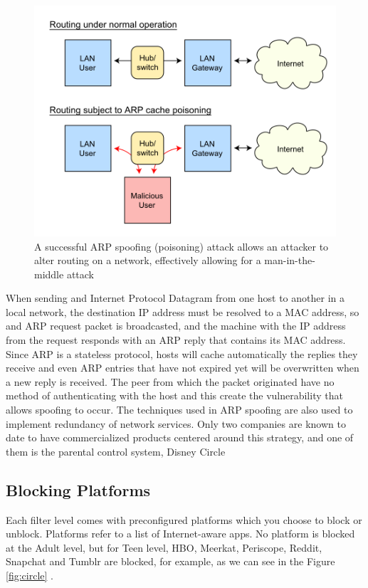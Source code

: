 \begin{figure}[th]
\centering
\includegraphics[width=1\textwidth]{Figures/arp-spoofing}
\decoRule
\caption{A successful ARP spoofing (poisoning) attack allows an attacker to alter routing on a network, effectively allowing for a man-in-the-middle attack}
\label{fig:arp-spoofing}
\end{figure}

When sending and Internet Protocol Datagram from one host to another in a local network, the destination IP address must be resolved to a MAC address, so and ARP request packet is broadcasted, and the machine with the IP address from the request responds with an ARP reply that contains its MAC address. Since ARP is a stateless protocol, hosts will cache automatically the replies they receive and even ARP entries that have not expired yet will be overwritten when a new reply is received. The peer from which the packet originated have no method of authenticating with the host and this create the vulnerability that allows spoofing to occur. The techniques used in ARP spoofing are also used to implement redundancy of network services. Only two companies are known to date to have commercialized products centered around this strategy, and one of them is the parental control system, Disney Circle

\subsection{Blocking Platforms}

Each filter level comes with preconfigured platforms which you choose to block or unblock. Platforms refer to a list of Internet-aware apps. No platform is blocked at the Adult level, but for Teen level, HBO, Meerkat, Periscope, Reddit, Snapchat and Tumblr are blocked, for example, as we can see in the Figure \ref{fig:circle} \citep{circleMashable}.

